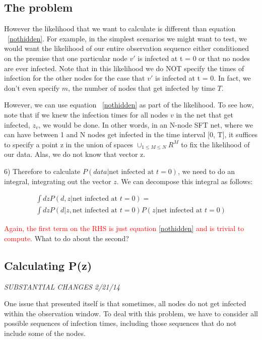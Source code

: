 \documentclass{article}
\begin{document}
\subsection{The problem}
	
        However the likelihood that we want to calculate is different than 
        equation ~\ref{nothidden}.  For example, in the simplest scenarios we might want
	to test, we would want the likelihood of our entire observation
	sequence either conditioned on the premise that one particular node
	$v'$ is infected at t = 0 or that no nodes are ever infected. 
        Note that in this likelihood we do NOT 
        specify the times of infection for the other nodes for the case that 
        $v'$ is infected at t = 0. In fact, we don't even specify $m$, the number
        of nodes that get infected by time $T$.


	However, we can use equation ~\ref{nothidden} as part of the  likelihood. To see how, 
        note that if we knew the infection times for all nodes $v$ in the net 
        that get infected,  $z_{v}$,  we would be done.  In other words, in an 
        N-node SFT net, where we can have between 1 and N nodes get infected in 
        the time interval [0, T], it suffices to specify a point z in the union 
        of spaces $\cup_{1 \le M \le N} R^M$ to fix the likelihood of our data.
        Alas, we do not know that vector z.


	6) Therefore to calculate  $P(data  | \text{net infected at } t = 0)$, 
        we need to do an integral, integrating out the vector $z$. We can 
        decompose this integral as follows:

\begin{align}
\int dz P(d, z | \text{net infected at } t = 0) = \\ 
\int dz P(d | z, \text{net infected at } t = 0) P(z | \text{net infected at } t=0)
\label{main}
\end{align}

	  \textcolor{red}{Again, the first term on the RHS is just equation \ref{nothidden} and 
          is trivial to compute.} What to do about the second?

\subsection{Calculating P(z)}

\emph{SUBSTANTIAL CHANGES 2/21/14}

    One issue that presented itself is that sometimes, all nodes do not get infected within
    the observation window.  To deal with this problem, we have to consider all possible sequences
    of infection times, including those sequences that do not include some of the nodes.  
\end{document}
